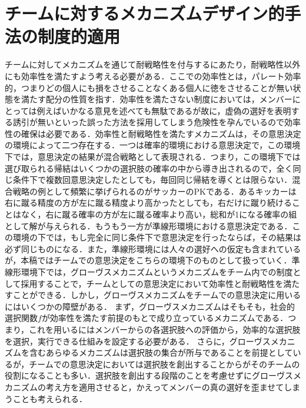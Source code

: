 \documentclass[a4paper, 11pt]{jsarticle}
\begin{document}
\section{チームに対するメカニズムデザイン的手法の制度的適用}
チームに対してメカニズムを通じて耐戦略性を付与するにあたり，耐戦略性以外にも効率性を満たすよう考える必要がある．ここでの効率性とは，パレート効率的，つまりどの個人にも損をさせることなくある個人に徳をさせることが無い状態を満たす配分の性質を指す．効率性を満たさない制度においては，メンバーにとっては例えばいかなる意見を述べても無駄であるが故に，虚偽の選好を表明する誘引が無いといった誤った方法を採用してしまう危険性を孕んでいるので効率性の確保は必要である．効率性と耐戦略性を満たすメカニズムは，その意思決定の環境によって二つ存在する．一つは確率的環境における意思決定で，この環境下では，意思決定の結果が混合戦略として表現される．つまり，この環境下では選び取られる帰結はいくつかの選択肢の確率の中から導き出されるので，全く同じ条件下で複数回意思決定したとしても，毎回同じ帰結を導くとは限らない．混合戦略の例として頻繁に挙げられるのがサッカーのPKである．あるキッカーは右に蹴る精度の方が左に蹴る精度より高かったとしても，右だけに蹴り続けることはなく，右に蹴る確率の方が左に蹴る確率より高い，総和が1になる確率の組として解が与えられる．もうもう一方が準線形環境における意思決定である．この環境の下では，もし完全に同じ条件下で意思決定を行ったならば，その結果は必ず同じものになる．また，準線形環境には人々の選好への仮定も含まれているが，本稿ではチームでの意思決定をこちらの環境下のものとして扱っていく．準線形環境下では，グローヴスメカニズムというメカニズムをチーム内での制度として採用することで，チームとしての意思決定において効率性と耐戦略性を満たすことができる．しかし，グローヴスメカニズムをチームでの意思決定に用いるにはいくつかの障壁がある．
まず，グローヴスメカニズムはそもそも，社会的選択関数\(f\)が効率性を満たす前提のもとで成り立っているメカニズムである．つまり，これを用いるにはメンバーからの各選択肢への評価から，効率的な選択肢を選択，実行できる仕組みを設定する必要がある．
さらに，グローヴスメカニズムを含むあらゆるメカニズムは選択肢の集合が所与であることを前提としているが，チームでの意思決定においては選択肢を創出することからがそのチームの役割になることも多い．選択肢を創出する段階のことを考慮せずにグローヴスメカニズムの考え方を適用させると，かえってメンバーの真の選好を歪ませてしまうことも考えられる．
\end{document}
